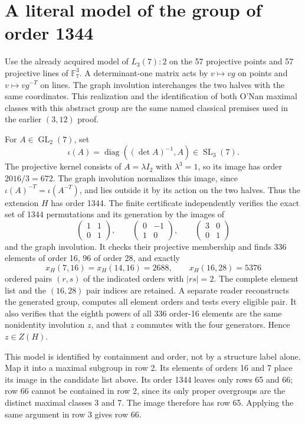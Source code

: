 \documentclass[11pt,a4paper]{article}
\begin{document}
\section{A literal model of the group of order 1344}
Use the already acquired model of $L_3(7):2$ on the 57 projective
points and 57 projective lines of $\mathbb F_7^3$. A determinant-one
matrix acts by $v\mapsto vg$ on points and $v\mapsto vg^{-T}$ on
lines. The graph involution interchanges the two halves with the same
coordinates. This realization and the identification of both O'Nan
maximal classes with this abstract group are the same named classical
premises used in the earlier $(3,12)$ proof.

For $A\in\operatorname{GL}_2(7)$, set
\[
 \iota(A)=\operatorname{diag}((\det A)^{-1},A)\in\operatorname{SL}_3(7).
\]
The projective kernel consists of $A=\lambda I_2$ with $\lambda^3=1$,
so its image has order $2016/3=672$. The graph involution normalizes
this image, since $\iota(A)^{-T}=\iota(A^{-T})$, and lies outside it
by its action on the two halves. Thus the extension $H$ has order 1344.
The finite certificate independently verifies the exact set of 1344
permutations and its generation by the images of
\[
 \begin{pmatrix}1&1\\0&1\end{pmatrix},\qquad
 \begin{pmatrix}0&-1\\1&0\end{pmatrix},\qquad
 \begin{pmatrix}3&0\\0&1\end{pmatrix}
\]
and the graph involution. It checks their projective membership and
finds 336 elements of order 16, 96 of order 28, and exactly
\[
 x_H(7,16)=x_H(14,16)=2688,\qquad x_H(16,28)=5376
\]
ordered pairs $(r,s)$ of the indicated orders with $|rs|=2$. The complete element list and the $(16,28)$ pair
indices are retained. A separate reader reconstructs the generated
group, computes all element orders and tests every eligible pair.
It also verifies that the eighth powers of all 336 order-16 elements
are the same nonidentity involution $z$, and that $z$ commutes with
the four generators. Hence $z\in Z(H)$.

This model is identified by containment and order, not by a structure
label alone. Map it into a maximal subgroup in row 2. Its elements of
orders 16 and 7 place its image in the candidate list above. Its order
1344 leaves only rows 65 and 66; row 66 cannot be contained in row 2,
since its only proper overgroups are the distinct maximal classes
3 and 7. The image therefore has row 65. Applying the same argument
in row 3 gives row 66. 
\end{document}
